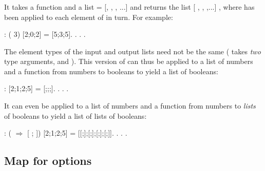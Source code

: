\documentclass[12pt]{report}
\begin{document}
\subsubsection{ }

 It takes a function  and a list   = [, , , ...] 
    and returns the list  [ ,  ,  ,...] , where  has
    been applied to each element of  in turn.  For example: \begin{coqdoccode}
\coqdocemptyline
\coqdocnoindent
{} :  ( 3) [2;0;2] = [5;3;5].\coqdoceol
\coqdocnoindent
{}. . .\coqdoceol
\coqdocemptyline
\end{coqdoccode}
The element types of the input and output lists need not be
    the same ( takes \textit{two} type arguments,  and ).  This
    version of  can thus be applied to a list of numbers and a
    function from numbers to booleans to yield a list of booleans: \begin{coqdoccode}
\coqdocemptyline
\coqdocnoindent
{} :   [2;1;2;5] = [;;;].\coqdoceol
\coqdocnoindent
{}. . .\coqdoceol
\coqdocemptyline
\end{coqdoccode}
It can even be applied to a list of numbers and
    a function from numbers to \textit{lists} of booleans to
    yield a list of lists of booleans: \begin{coqdoccode}
\coqdocemptyline
\coqdocnoindent
{} :\coqdoceol
\coqdocindent{2.00em}
 (  \ensuremath{\Rightarrow} [ ; ]) [2;1;2;5]\coqdoceol
\coqdocindent{1.00em}
= [[;];[;];[;];[;]].\coqdoceol
\coqdocnoindent
{}. . .\coqdoceol
\coqdocemptyline
\end{coqdoccode}
\subsection{Map for options}
\end{document}
